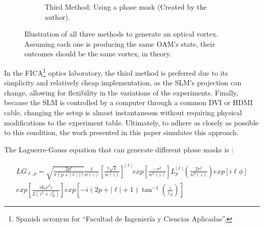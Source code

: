 \begin{figure}[htbp]
\begin{subfigure}[b]{0.3\textwidth}
        \caption{Third Method: Using a phase mask (Created by the author).}
    \end{subfigure}
    \caption{Illustration of all three methods to generate an optical vortex. Assuming each one is producing the same OAM's state, their outcomes should be the same vortex, in theory.}
    \label{fig:OAM_Generation_Methods}
\end{figure}

In the FICA\footnote{Spanish acronym for ``Facultad de Ingeniería y Ciencias Aplicadas''.} optics laboratory, the third method is preferred due to its simplicity and relatively cheap implementation, as the SLM's projection can change, allowing for flexibility in the variations of the experiments. Finally, because the SLM is controlled by a computer through a common DVI or HDMI cable, changing the setup is almost instantaneous without requiring physical modifications to the experiment table. Ultimately, to adhere as closely as possible to this condition, the work presented in this paper simulates this approach.

The Laguerre-Gauss equation that can generate different phase masks is \cite{Yao-Padgett:2011}:

\begin{eqnarray}
    LG_{\ell, p} = \sqrt{\frac{2p!}{\pi (p + |\ell|)!}}\frac{1}{w(z)}\left[ \frac{r\sqrt{2}}{w(z)} \right]^{|\ell|}exp\left[ \frac{-r^2}{w^2(z)} \right] L_p^{|\ell|} \left( \frac{2r^2}{w^2(z)} \right) exp[i\ell\phi]\nonumber\\exp\left[ \frac{ik_0r^2z}{2(z^2+z^2_R)} \right] exp \left[ -i(2p+|\ell|+1)\tan^{-1}{\left( \frac{z}{z_R} \right)} \right]
    \label{Laguerre-Gauss Equation}
\end{eqnarray}

